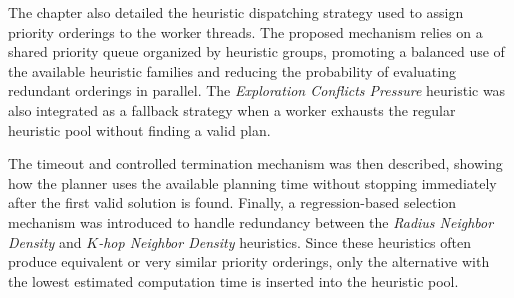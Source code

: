 The chapter also detailed the heuristic dispatching strategy used to assign priority orderings to the
worker threads. The proposed mechanism relies on a shared priority queue organized by heuristic
groups, promoting a balanced use of the available heuristic families and reducing the probability of
evaluating redundant orderings in parallel. The \textit{Exploration Conflicts Pressure} heuristic was
also integrated as a fallback strategy when a worker exhausts the regular heuristic pool without
finding a valid plan.

The timeout and controlled termination mechanism was then described, showing how the planner
uses the available planning time without stopping immediately after the first valid solution is found.
Finally, a regression-based selection mechanism was introduced to handle redundancy between the
\textit{Radius Neighbor Density} and \textit{\(K\)-hop Neighbor Density} heuristics. Since these heuristics
often produce equivalent or very similar priority orderings, only the alternative with the lowest
estimated computation time is inserted into the heuristic pool.